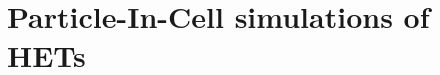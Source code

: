  

\chapter{Particle-In-Cell simulations of HETs}
\label{ch-1}

\begin{Chabstract}
  
\lipsum[1-2]

\end{Chabstract}

\minitoc


 



